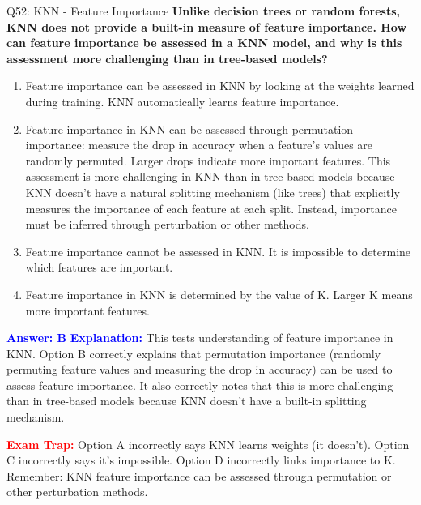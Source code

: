 \documentclass[8pt]{beamer}
\begin{document}
	\begin{frame}{Q52: KNN - Feature Importance}
		\fontsize{6.5}{7.5}\selectfont
		\textbf{Unlike decision trees or random forests, KNN does not provide a built-in measure of feature importance. How can feature importance be assessed in a KNN model, and why is this assessment more challenging than in tree-based models?}
		
		\begin{enumerate}
			\item Feature importance can be assessed in KNN by looking at the weights learned during training. KNN automatically learns feature importance.
			\item Feature importance in KNN can be assessed through permutation importance: measure the drop in accuracy when a feature's values are randomly permuted. Larger drops indicate more important features. This assessment is more challenging in KNN than in tree-based models because KNN doesn't have a natural splitting mechanism (like trees) that explicitly measures the importance of each feature at each split. Instead, importance must be inferred through perturbation or other methods.
			\item Feature importance cannot be assessed in KNN. It is impossible to determine which features are important.
			\item Feature importance in KNN is determined by the value of K. Larger K means more important features.
		\end{enumerate}
		
		\vspace{0.1cm}
		\textcolor{blue}{\textbf{Answer: B}}
		\vspace{0.1cm}
		\textcolor{blue}{\textbf{Explanation:}} This tests understanding of feature importance in KNN. Option B correctly explains that permutation importance (randomly permuting feature values and measuring the drop in accuracy) can be used to assess feature importance. It also correctly notes that this is more challenging than in tree-based models because KNN doesn't have a built-in splitting mechanism.
		
		\textcolor{red}{\textbf{Exam Trap:}} Option A incorrectly says KNN learns weights (it doesn't). Option C incorrectly says it's impossible. Option D incorrectly links importance to K. Remember: KNN feature importance can be assessed through permutation or other perturbation methods.
	\end{frame}
	
\end{document}
